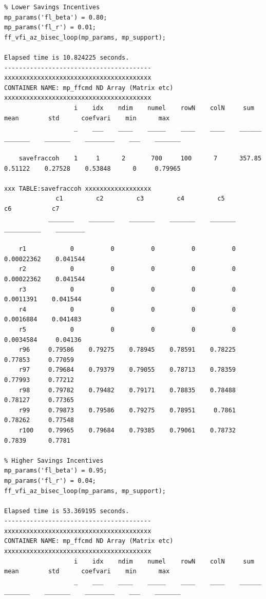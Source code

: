 \documentclass[
]{book}
\begin{document}
\begin{verbatim}
% Lower Savings Incentives
mp_params('fl_beta') = 0.80;
mp_params('fl_r') = 0.01;
ff_vfi_az_bisec_loop(mp_params, mp_support);

Elapsed time is 10.824225 seconds.
----------------------------------------
xxxxxxxxxxxxxxxxxxxxxxxxxxxxxxxxxxxxxxxx
CONTAINER NAME: mp_ffcmd ND Array (Matrix etc)
xxxxxxxxxxxxxxxxxxxxxxxxxxxxxxxxxxxxxxxx
                   i    idx    ndim    numel    rowN    colN     sum       mean        std      coefvari    min      max  
                   _    ___    ____    _____    ____    ____    ______    _______    _______    ________    ___    _______

    savefraccoh    1     1      2       700     100      7      357.85    0.51122    0.27528    0.53848      0     0.79965

xxx TABLE:savefraccoh xxxxxxxxxxxxxxxxxx
              c1         c2         c3         c4         c5           c6           c7   
            _______    _______    _______    _______    _______    __________    ________

    r1            0          0          0          0          0    0.00022362    0.041544
    r2            0          0          0          0          0    0.00022362    0.041544
    r3            0          0          0          0          0     0.0011391    0.041544
    r4            0          0          0          0          0     0.0016884    0.041483
    r5            0          0          0          0          0     0.0034584     0.04136
    r96     0.79586    0.79275    0.78945    0.78591    0.78225       0.77853     0.77059
    r97     0.79684    0.79379    0.79055    0.78713    0.78359       0.77993     0.77212
    r98     0.79782    0.79482    0.79171    0.78835    0.78488       0.78127     0.77365
    r99     0.79873    0.79586    0.79275    0.78951     0.7861       0.78262     0.77548
    r100    0.79965    0.79684    0.79385    0.79061    0.78732        0.7839      0.7781

% Higher Savings Incentives
mp_params('fl_beta') = 0.95;
mp_params('fl_r') = 0.04;
ff_vfi_az_bisec_loop(mp_params, mp_support);

Elapsed time is 53.369195 seconds.
----------------------------------------
xxxxxxxxxxxxxxxxxxxxxxxxxxxxxxxxxxxxxxxx
CONTAINER NAME: mp_ffcmd ND Array (Matrix etc)
xxxxxxxxxxxxxxxxxxxxxxxxxxxxxxxxxxxxxxxx
                   i    idx    ndim    numel    rowN    colN     sum       mean        std      coefvari    min      max  
                   _    ___    ____    _____    ____    ____    ______    _______    _______    ________    ___    _______


\end{verbatim}
\end{document}
